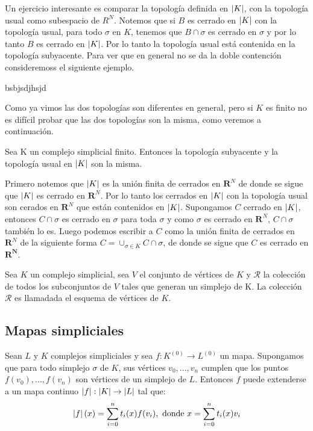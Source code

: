 Un ejercicio interesante es comparar la topología definida en $\left| K \right|$, con la topología usual como subespacio de $R^{N}$. Notemos que si $B$ es cerrado en $\left| K \right|$ con la topología usual, para todo $\sigma$ en $K$, tenemos que $B\cap\sigma$ es cerrado en $\sigma$ y por lo tanto $B$ es cerrado en $\left| K \right|$. Por lo tanto la topología usual está contenida en la topología subyacente. Para ver que en general no se da la doble contención consideremoss el siguiente ejemplo.
\begin{Ejem}
bsbjsdjhsjd
\end{Ejem}
Como ya vimos las dos topologías son diferentes en general, pero si $K$ es finito no es difícil probar que las dos topologías son la misma, como veremos a continuación.
\begin{Prop}
Sea K un complejo simplicial finito. Entonces la topología subyacente y la topología usual en $\left| K \right|$ son la misma.
\end{Prop}
\begin{Dem}

Primero notemos que $\left| K \right|$ es la unión finita de cerrados en $\mathbf{R}^N$ de donde se sigue que $\left| K \right|$ es cerrado en $\mathbf{R}^N$. Por lo tanto los cerrados en $\left| K \right|$ con la topología usual son cerados en $\mathbf{R}^N$ que están contenidos en $\left| K \right|$.
Supongamos $C$ cerrado en $\left| K \right|$, entonces $C\cap\sigma$ es cerrado en $\sigma$ para toda $\sigma$ y como $\sigma$ es cerrado en $\mathbf{R}^N$, $C\cap\sigma$ también lo es. Luego podemos escribir a $C$ como la unión finita de cerrados en  $\mathbf{R}^N$ de la siguiente forma $C=\cup_{\sigma\in K}C\cap\sigma$, de donde se sigue que $C$ es cerrado en $\mathbf{R^N}$.
\end{Dem}
\begin{Defi}
Sea $K$ un complejo simplicial, sea $V$ el conjunto de vértices de $K$ y $\mathcal{R}$ la colección de todos los subconjuntos de $V$ tales que generan un simplejo de K. La colección $\mathcal{R}$ es llamadada el esquema de vértices de $K$.
\end{Defi}
\subsection{Mapas simpliciales}
\begin{Teo}
Sean $L$ y $K$ complejos simpliciales y sea $f\colon K^{(0)} \rightarrow L^{(0)}$ un mapa. Supongamos que  para todo simplejo $\sigma$ de $K$, sus vértices $v_0,...,v_n$ cumplen que los puntos $f(v_0),...,f(v_n)$ son vértices de un simplejo de $L$. Entonces $f$ puede extenderse a un mapa continuo $\left| f \right|:\left| K \right|  \rightarrow \left| L \right|$ tal que:
\begin{equation*}
\left| f \right|(x)= \sum_{i=0}^{n}t_i(x)f(v_i), \textrm{ donde }  x= \sum_{i=0}^{n}t_i(x)v_i
\end{equation*}

\end{Teo}
